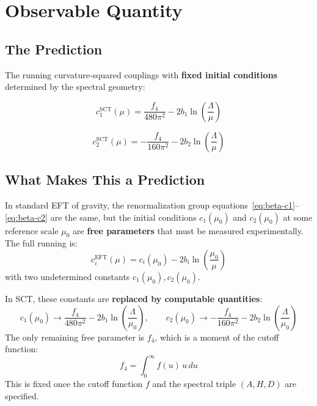 \documentclass[11pt,a4paper]{article}
\begin{document}
\section{Observable Quantity}

\subsection{The Prediction}

The running curvature-squared couplings with \textbf{fixed initial conditions} determined by the spectral geometry:

\begin{equation}
  \boxed{
    c_1^{\text{SCT}}(\mu) = \frac{f_4}{480\pi^2} - 2b_1\ln\!\left(\frac{\Lambda}{\mu}\right)
  }
  \label{eq:prediction}
\end{equation}

\begin{equation}
  \boxed{
    c_2^{\text{SCT}}(\mu) = -\frac{f_4}{160\pi^2} - 2b_2\ln\!\left(\frac{\Lambda}{\mu}\right)
  }
  \label{eq:prediction2}
\end{equation}

\subsection{What Makes This a Prediction}

In standard EFT of gravity, the renormalization group equations~\eqref{eq:beta-c1}--\eqref{eq:beta-c2} are the same, but the initial conditions $c_1(\mu_0)$ and $c_2(\mu_0)$ at some reference scale $\mu_0$ are \textbf{free parameters} that must be measured experimentally. The full running is:
\begin{equation}
  c_i^{\text{EFT}}(\mu) = c_i(\mu_0) - 2b_i\ln\!\left(\frac{\mu_0}{\mu}\right)
  \label{eq:eft-running}
\end{equation}
with two undetermined constants $c_1(\mu_0), c_2(\mu_0)$.

In SCT, these constants are \textbf{replaced by computable quantities}:
\begin{equation}
  c_1(\mu_0) \to \frac{f_4}{480\pi^2} - 2b_1\ln\!\left(\frac{\Lambda}{\mu_0}\right), \qquad
  c_2(\mu_0) \to -\frac{f_4}{160\pi^2} - 2b_2\ln\!\left(\frac{\Lambda}{\mu_0}\right)
\end{equation}
The only remaining free parameter is $f_4$, which is a moment of the cutoff function:
\begin{equation}
  f_4 = \int_0^\infty f(u)\,u\,du
  \label{eq:f4-definition}
\end{equation}
This is fixed once the cutoff function $f$ and the spectral triple $(A, H, D)$ are specified.
\end{document}
